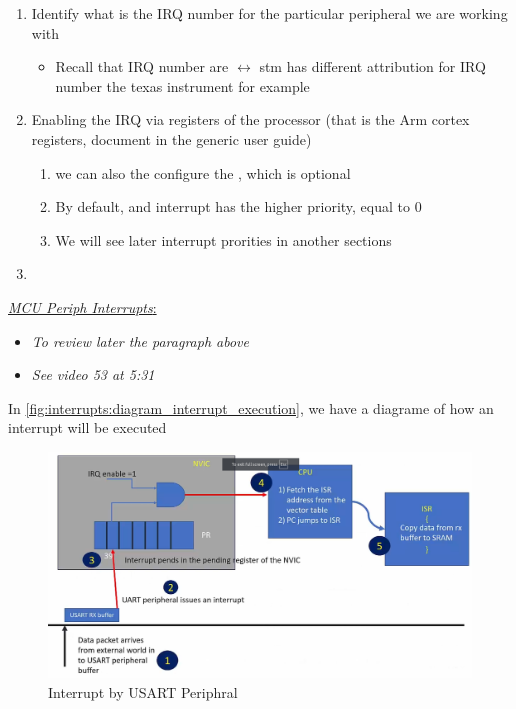 \begin{enumerate}

\item Identify what is the IRQ number for the particular peripheral we are working with

	\begin{itemize}
	\item Recall that IRQ number are  $\leftrightarrow$ stm has different attribution for IRQ number the texas instrument for example
	\end{itemize}

\item Enabling the IRQ via registers of the processor (that is the Arm cortex registers, document in the generic user guide)

	\begin{enumerate}
	\item we can also the configure the , which is optional
	
	\item By default, and interrupt has the higher priority, equal to 0
	
	\item We will see later interrupt prorities in another sections
	
	\end{enumerate}

\item 

\end{enumerate}

 \underline{\textit{MCU Periph Interrupts}:}

\begin{itemize}

\item \textit{To review later the paragraph above}

\item \textit{See video 53 at 5:31}

\end{itemize} 


In \autoref{fig:interrupts:diagram_interrupt_execution}, we have a diagrame of how an interrupt will be executed

\begin{figure}[h]
\centering
\includegraphics[scale=0.2,frame]{Figures/interrupts/diagram_interrupt_execution}
\caption{Interrupt by USART Periphral}
\label{fig:interrupts:diagram_interrupt_execution}
\end{figure}

